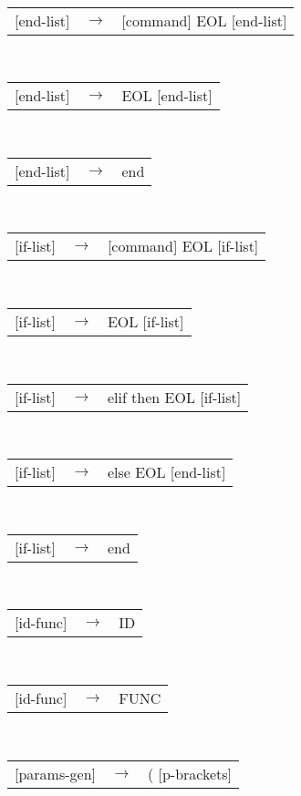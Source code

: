 \documentclass[11pt, a4paper]{article}
\begin{document}
\begin{algorithm}[H]
\begin{tabularx}{\textwidth}{l>{$}c<{$}X}
\end{tabularx}\\ 
  \begin{tabularx}{\textwidth}{l>{$}c<{$}X}
  {[end-list]}  &\rightarrow& [command] EOL [end-list]
\end{tabularx}\\ 
  \begin{tabularx}{\textwidth}{l>{$}c<{$}X}
  {[end-list]}  &\rightarrow& EOL [end-list]
\end{tabularx}\\ 
  \begin{tabularx}{\textwidth}{l>{$}c<{$}X}
  {[end-list]}  &\rightarrow& end
\end{tabularx}\\ 
  \begin{tabularx}{\textwidth}{l>{$}c<{$}X}
  {[if-list]}  &\rightarrow& [command] EOL [if-list]
\end{tabularx}\\ 
  \begin{tabularx}{\textwidth}{l>{$}c<{$}X}
  {[if-list]}  &\rightarrow& EOL [if-list]
\end{tabularx}\\ 
  \begin{tabularx}{\textwidth}{l>{$}c<{$}X}
  {[if-list]}  &\rightarrow& elif then EOL [if-list]
\end{tabularx}\\ 
  \begin{tabularx}{\textwidth}{l>{$}c<{$}X}
  {[if-list]}  &\rightarrow& else EOL [end-list]
\end{tabularx}\\ 
  \begin{tabularx}{\textwidth}{l>{$}c<{$}X}
  {[if-list]}  &\rightarrow& end 
\end{tabularx}\\ 
  \begin{tabularx}{\textwidth}{l>{$}c<{$}X}
  {[id-func]}    &\rightarrow& ID
\end{tabularx}\\ 
  \begin{tabularx}{\textwidth}{l>{$}c<{$}X}
  {[id-func]}    &\rightarrow& FUNC
\end{tabularx}\\ 
  \begin{tabularx}{\textwidth}{l>{$}c<{$}X}
  {[params-gen]} &\rightarrow& ( [p-brackets] 
\end{tabularx}\\ 
  \begin{tabularx}{\textwidth}{l>{$}c<{$}X}

\end{tabularx}
\end{algorithm}
\end{document}
